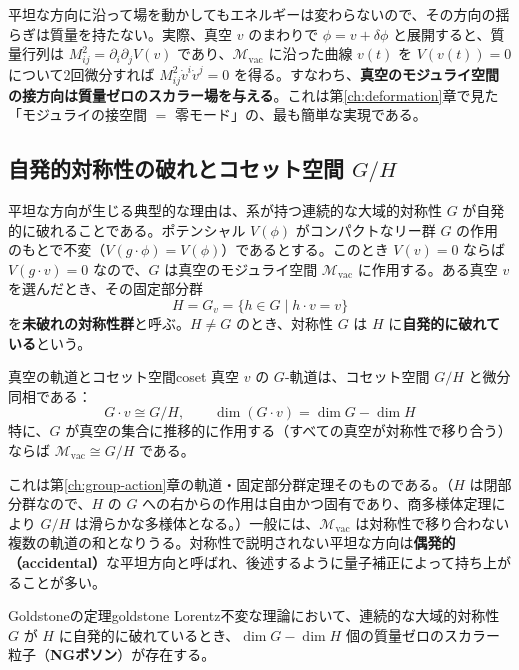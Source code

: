 \documentclass[uplatex, dvipdfmx, book]{jsbook}
\let\origsubsection\subsection
\let\origsubsubsection\subsubsection
\renewcommand{\section}{\origsubsection}
\renewcommand{\subsection}{\origsubsubsection}
\renewcommand{\subsubsection}{\paragraph}
\begin{document}
平坦な方向に沿って場を動かしてもエネルギーは変わらないので、その方向の揺らぎは質量を持たない。実際、真空 $v$ のまわりで $\phi = v + \delta\phi$ と展開すると、質量行列は $M^2_{ij} = \partial_i\partial_j V(v)$ であり、$\mathcal{M}_{\text{vac}}$ に沿った曲線 $v(t)$ を $V(v(t)) = 0$ について2回微分すれば $M^2_{ij}\dot v^i \dot v^j = 0$ を得る。すなわち、\textbf{真空のモジュライ空間の接方向は質量ゼロのスカラー場を与える}。これは第\ref{ch:deformation}章で見た「モジュライの接空間 $=$ 零モード」の、最も簡単な実現である。

\section{自発的対称性の破れとコセット空間 $G/H$}

平坦な方向が生じる典型的な理由は、系が持つ連続的な大域的対称性 $G$ が自発的に破れることである。ポテンシャル $V(\phi)$ がコンパクトなリー群 $G$ の作用のもとで不変（$V(g \cdot \phi) = V(\phi)$）であるとする。このとき $V(v) = 0$ ならば $V(g\cdot v) = 0$ なので、$G$ は真空のモジュライ空間 $\mathcal{M}_{\text{vac}}$ に作用する。ある真空 $v$ を選んだとき、その固定部分群
\begin{equation}
    H = G_v = \{ h \in G \mid h \cdot v = v \}
\end{equation}
を\textbf{未破れの対称性群}と呼ぶ。$H \neq G$ のとき、対称性 $G$ は $H$ に\textbf{自発的に破れている}という。

\begin{myprop}{真空の軌道とコセット空間}{coset}
真空 $v$ の $G$-軌道は、コセット空間 $G/H$ と微分同相である：
\begin{equation*}
    G \cdot v \cong G/H, \qquad \dim (G \cdot v) = \dim G - \dim H
\end{equation*}
特に、$G$ が真空の集合に推移的に作用する（すべての真空が対称性で移り合う）ならば $\mathcal{M}_{\text{vac}} \cong G/H$ である。
\end{myprop}

これは第\ref{ch:group-action}章の軌道・固定部分群定理そのものである。（$H$ は閉部分群なので、$H$ の $G$ への右からの作用は自由かつ固有であり、商多様体定理により $G/H$ は滑らかな多様体となる。）一般には、$\mathcal{M}_{\text{vac}}$ は対称性で移り合わない複数の軌道の和となりうる。対称性で説明されない平坦な方向は\textbf{偶発的（accidental）}な平坦方向と呼ばれ、後述するように量子補正によって持ち上がることが多い。

\begin{mythm}{Goldstoneの定理}{goldstone}
Lorentz不変な理論において、連続的な大域的対称性 $G$ が $H$ に自発的に破れているとき、$\dim G - \dim H$ 個の質量ゼロのスカラー粒子（\textbf{NGボソン}）が存在する。
\end{mythm}
\end{document}
